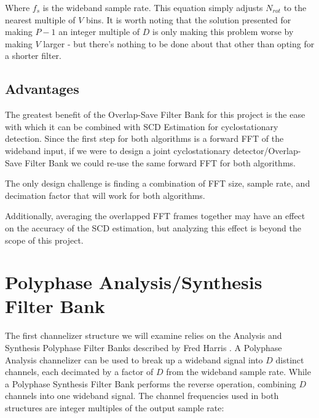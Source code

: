 \documentclass[12pt]{article}
\begin{document}
Where $f_s$ is the wideband sample rate. This equation simply adjusts $N_{rot}$
to the nearest multiple of $V$ bins. It is worth noting that the solution
presented for making $P-1$ an integer multiple of $D$ is only making this
problem worse by making $V$ larger - but there's nothing to be done about that
other than opting for a shorter filter.

\subsection{Advantages}
\label{sec:os_advantages}

The greatest benefit of the Overlap-Save Filter Bank for this project is the
ease with which it can be combined with SCD Estimation for cyclostationary
detection. Since the first step for both algorithms is a forward FFT of the
wideband input, if we were to design a joint cyclostationary
detector/Overlap-Save Filter Bank we could re-use the same forward FFT for both
algorithms.

The only design challenge is finding a combination of FFT size, sample rate,
and decimation factor that will work for both algorithms.



Additionally, averaging the overlapped FFT frames together may have an effect
on the accuracy of the SCD estimation, but analyzing this effect is beyond the
scope of this project.


\section{Polyphase Analysis/Synthesis Filter Bank}
\label{sec:poly_chan}
The first channelizer structure we will examine relies on the Analysis and
Synthesis Polyphase Filter Banks described by Fred Harris \cite{Harris1}.
A Polyphase Analysis channelizer can be used to break up a wideband signal into
$D$ distinct channels, each decimated by a factor of $D$ from the wideband
sample rate.  While a Polyphase Synthesis Filter Bank performs the reverse
operation, combining $D$ channels into one wideband signal. The channel
frequencies used in both structures are integer multiples of the output sample
rate:
\end{document}
